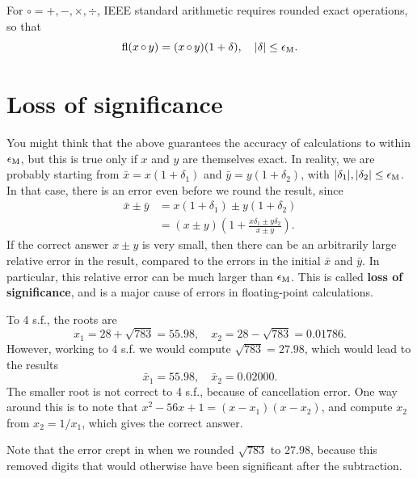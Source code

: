 \documentclass[
  letterpaper,
  DIV=11,
  numbers=noendperiod]{scrreprt}
\begin{document}
For \({\circ} = +,-,\times, \div\), IEEE standard arithmetic requires
rounded exact operations, so that \[
\mathrm{fl}(x {\,\circ\,} y) = (x {\,\circ\,} y)(1+\delta), \quad |\delta|\leq\epsilon_{\rm M}.
\]

\section{Loss of significance}\label{loss-of-significance}

You might think that the above guarantees the accuracy of calculations
to within \(\epsilon_{\rm M}\), but this is true only if \(x\) and \(y\)
are themselves exact. In reality, we are probably starting from
\(\bar{x}=x(1+\delta_1)\) and \(\bar{y}=y(1 + \delta_2)\), with
\(|\delta_1|, |\delta_2| \leq \epsilon_{\rm M}\). In that case, there is
an error even before we round the result, since \[
\begin{aligned}
\bar{x} \pm \bar{y} &= x(1+ \delta_1) \pm y(1 + \delta_2)\\
&= (x\pm y)\left(1 + \frac{x\delta_1 \pm y\delta_2}{x\pm y}\right).
\end{aligned}
\] If the correct answer \(x\pm y\) is very small, then there can be an
arbitrarily large relative error in the result, compared to the errors
in the initial \(\bar{x}\) and \(\bar{y}\). In particular, this relative
error can be much larger than \(\epsilon_{\rm M}\). This is called
\textbf{loss of significance}, and is a major cause of errors in
floating-point calculations.

To 4 s.f., the roots are \[
x_1 = 28 + \sqrt{783} = 55.98, \quad x_2 = 28-\sqrt{783} = 0.01786.
\] However, working to 4 s.f. we would compute \(\sqrt{783} = 27.98\),
which would lead to the results \[
\bar{x}_1 = 55.98, \quad \bar{x}_2 = 0.02000.
\] The smaller root is not correct to 4 s.f., because of cancellation
error. One way around this is to note that
\(x^2 - 56x + 1 = (x-x_1)(x-x_2)\), and compute \(x_2\) from
\(x_2 = 1/x_1\), which gives the correct answer.

\begin{tcolorbox}[enhanced jigsaw, arc=.35mm, toprule=.15mm, colframe=quarto-callout-note-color-frame, left=2mm, toptitle=1mm, titlerule=0mm, breakable, opacityback=0, bottomtitle=1mm, title=\textcolor{quarto-callout-note-color}{\faInfo}\hspace{0.5em}{Note}, rightrule=.15mm, opacitybacktitle=0.6, colbacktitle=quarto-callout-note-color!10!white, colback=white, leftrule=.75mm, bottomrule=.15mm, coltitle=black]

Note that the error crept in when we rounded \(\sqrt{783}\) to
\(27.98\), because this removed digits that would otherwise have been
significant after the subtraction.

\end{tcolorbox}
\end{document}
